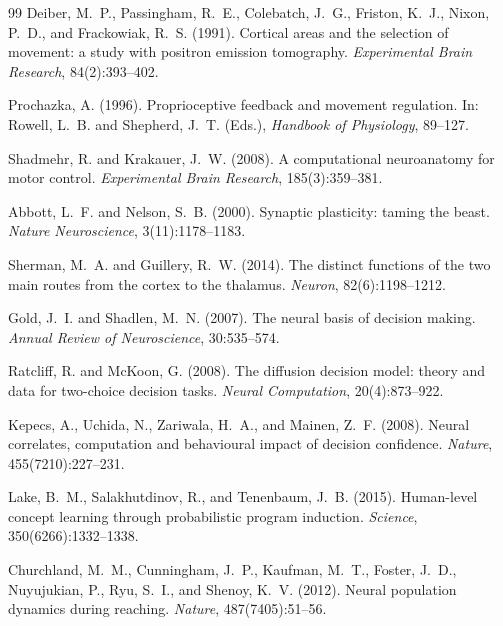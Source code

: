 \documentclass[10pt,onecolumn]{article}
\begin{document}
\begin{thebibliography}{99}
Deiber, M.~P., Passingham, R.~E., Colebatch, J.~G., Friston, K.~J., Nixon, P.~D., and Frackowiak, R.~S. (1991).
\newblock Cortical areas and the selection of movement: a study with positron emission tomography.
\newblock \textit{Experimental Brain Research}, 84(2):393--402.

Prochazka, A. (1996).
\newblock Proprioceptive feedback and movement regulation.
\newblock In: Rowell, L.~B. and Shepherd, J.~T. (Eds.), \textit{Handbook of Physiology}, 89--127.

Shadmehr, R. and Krakauer, J.~W. (2008).
\newblock A computational neuroanatomy for motor control.
\newblock \textit{Experimental Brain Research}, 185(3):359--381.

Abbott, L.~F. and Nelson, S.~B. (2000).
\newblock Synaptic plasticity: taming the beast.
\newblock \textit{Nature Neuroscience}, 3(11):1178--1183.

Sherman, M.~A. and Guillery, R.~W. (2014).
\newblock The distinct functions of the two main routes from the cortex to the thalamus.
\newblock \textit{Neuron}, 82(6):1198--1212.

Gold, J.~I. and Shadlen, M.~N. (2007).
\newblock The neural basis of decision making.
\newblock \textit{Annual Review of Neuroscience}, 30:535--574.

Ratcliff, R. and McKoon, G. (2008).
\newblock The diffusion decision model: theory and data for two-choice decision tasks.
\newblock \textit{Neural Computation}, 20(4):873--922.

Kepecs, A., Uchida, N., Zariwala, H.~A., and Mainen, Z.~F. (2008).
\newblock Neural correlates, computation and behavioural impact of decision confidence.
\newblock \textit{Nature}, 455(7210):227--231.

Lake, B.~M., Salakhutdinov, R., and Tenenbaum, J.~B. (2015).
\newblock Human-level concept learning through probabilistic program induction.
\newblock \textit{Science}, 350(6266):1332--1338.

Churchland, M.~M., Cunningham, J.~P., Kaufman, M.~T., Foster, J.~D., Nuyujukian, P., Ryu, S.~I., and Shenoy, K.~V. (2012).
\newblock Neural population dynamics during reaching.
\newblock \textit{Nature}, 487(7405):51--56.


\end{thebibliography}
\end{document}
